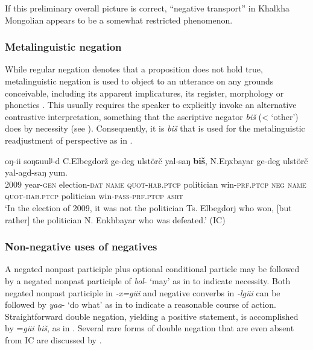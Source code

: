 \documentclass[output=paper,colorlinks,citecolor=brown,chinesefont]{langscibook}
\begin{document}
If this preliminary overall picture is correct, “negative transport” in Khalkha Mongolian appears to be a somewhat restricted phenomenon.

\subsubsection{Metalinguistic negation}\label{sec:kha:4.6.2}

While regular negation denotes that a proposition does not hold true, metalinguistic negation is used to object to an utterance on any grounds conceivable, including its apparent implicatures, its register, morphology or phonetics \citep[363]{Horn1989}. This usually requires the speaker to explicitly invoke an alternative contrastive interpretation, something that the ascriptive negator \textit{biš} (< ‘other’) does by necessity (see ). Consequently, it is \textit{biš} that is used for the metalinguistic readjustment of perspective as in .


\ea\label{ex:kha:87}
     oŋ-ii soŋɢuulʲ-d C.Elbegdorž ge-deg ulstörč yal-saŋ \textbf{biš}, N.Eŋxbayar ge-deg ulstörč yal-agd-saŋ yum. \\ 
         2009 year-\textsc{gen} election-\textsc{dat} \textsc{name} \textsc{quot-hab.ptcp} politician win-\textsc{prf.ptcp} \textsc{neg} \textsc{name} \textsc{quot-hab.ptcp} politician win-\textsc{pass-prf.ptcp} \textsc{asrt} \\
    \glt ‘In the election of 2009, it was not the politician Ts. Elbegdorj who won, [but rather] the politician N. Enkhbayar who was defeated.’ (IC)
\z 
 

\subsubsection{Non-negative uses of negatives}\label{sec:kha:4.6.3}

A negated nonpast participle plus optional conditional particle may be followed by a negated nonpast participle of \textit{bol}{}- ‘may’ as in  to indicate necessity. Both negated nonpast participle in \textit{-x=güi} and negative converbs in \textit{-lgüi} can be followed by \textit{yaa}{}- ‘do what’ as in  to indicate a reasonable course of action. Straightforward double negation, yielding a positive statement, is accomplished by =\textit{güi biš}, as in . Several rare forms of double negation that are even absent from IC are discussed by \citet{Pjurbeev2015}.
\end{document}
